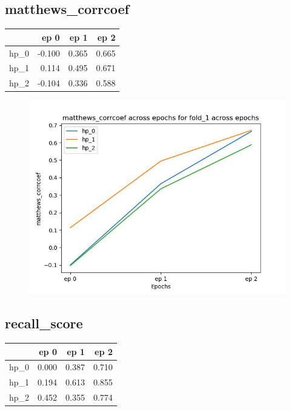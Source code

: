 \documentclass{article}
\begin{document}
\subsection{matthews\_corrcoef}
\begin{tabular}{lrrr}
\toprule
{} &   ep 0 &   ep 1 &   ep 2 \\
\midrule
hp\_0 & -0.100 &  0.365 &  0.665 \\
hp\_1 &  0.114 &  0.495 &  0.671 \\
hp\_2 & -0.104 &  0.336 &  0.588 \\
\bottomrule
\end{tabular}

\begin{figure}[H]
\includegraphics[scale = 0.75]{fold_1/matthews_corrcoef}
\end{figure}
\subsection{recall\_score}
\begin{tabular}{lrrr}
\toprule
{} &   ep 0 &   ep 1 &   ep 2 \\
\midrule
hp\_0 &  0.000 &  0.387 &  0.710 \\
hp\_1 &  0.194 &  0.613 &  0.855 \\
hp\_2 &  0.452 &  0.355 &  0.774 \\
\bottomrule
\end{tabular}
\end{document}
